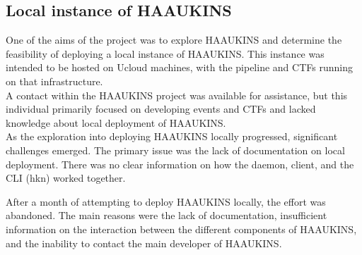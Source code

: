 \subsection{Local instance of HAAUKINS}
One of the aims of the project was to explore \ac{HAAUKINS} and determine the feasibility of deploying a local instance of 
\ac{HAAUKINS}. This instance was intended to be hosted on \ac{Ucloud} machines, with the pipeline and \ac{CTF}s running on that infrastructure.\\
A contact within the HAAUKINS project was available for assistance, but this individual primarily focused on developing 
events and \ac{CTF}s and lacked knowledge about local deployment of HAAUKINS.\\
As the exploration into deploying \ac{HAAUKINS} locally progressed, significant challenges emerged. 
The primary issue was the lack of documentation on local deployment. There was no clear information on how the daemon, 
client, and the CLI (hkn) worked together.

After a month of attempting to deploy \ac{HAAUKINS} locally, the effort was abandoned. 
The main reasons were the lack of documentation, insufficient information on the interaction between the different components of \ac{HAAUKINS}, 
and the inability to contact the main developer of \ac{HAAUKINS}.
